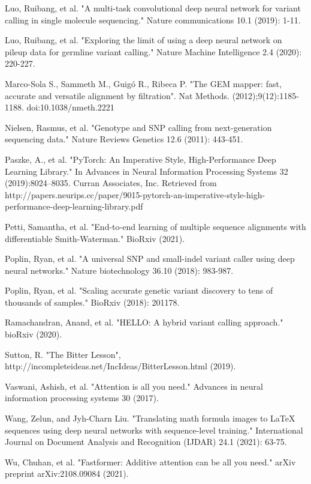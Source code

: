 \documentclass[]{article}
\begin{document}
\vspace{8pt}
Luo, Ruibang, et al. "A multi-task convolutional deep neural network for variant calling in single molecule sequencing." Nature communications 10.1 (2019): 1-11.

\vspace{8pt}
Luo, Ruibang, et al. "Exploring the limit of using a deep neural network on pileup data for germline variant calling." Nature Machine Intelligence 2.4 (2020): 220-227.

\vspace{8pt}
Marco-Sola S., Sammeth M., Guigó R., Ribeca P. "The GEM mapper: fast, accurate and versatile alignment by filtration". Nat Methods. (2012);9(12):1185-1188. doi:10.1038/nmeth.2221

\vspace{8pt}
Nielsen, Rasmus, et al. "Genotype and SNP calling from next-generation sequencing data." Nature Reviews Genetics 12.6 (2011): 443-451.

\vspace{8pt}
Paszke, A., et al. "PyTorch: An Imperative Style, High-Performance Deep Learning Library." In Advances in Neural Information Processing Systems 32 (2019):8024–8035. Curran Associates, Inc. Retrieved from http://papers.neurips.cc/paper/9015-pytorch-an-imperative-style-high-performance-deep-learning-library.pdf

\vspace{8pt}
Petti, Samantha, et al. "End-to-end learning of multiple sequence alignments with differentiable Smith-Waterman." BioRxiv (2021).

\vspace{8pt}
Poplin, Ryan, et al. "A universal SNP and small-indel variant caller using deep neural networks." Nature biotechnology 36.10 (2018): 983-987.

\vspace{8pt}
Poplin, Ryan, et al. "Scaling accurate genetic variant discovery to tens of thousands of samples." BioRxiv (2018): 201178.

\vspace{8pt}
Ramachandran, Anand, et al. "HELLO: A hybrid variant calling approach." bioRxiv (2020).
 
\vspace{8pt}
Sutton, R. "The Bitter Lesson", http://incompleteideas.net/IncIdeas/BitterLesson.html (2019).

\vspace{8pt}
Vaswani, Ashish, et al. "Attention is all you need." Advances in neural information processing systems 30 (2017).

\vspace{8pt}
Wang, Zelun, and Jyh-Charn Liu. "Translating math formula images to LaTeX sequences using deep neural networks with sequence-level training." International Journal on Document Analysis and Recognition (IJDAR) 24.1 (2021): 63-75.

\vspace{8pt}
Wu, Chuhan, et al. "Fastformer: Additive attention can be all you need." arXiv preprint arXiv:2108.09084 (2021).
\end{document}
